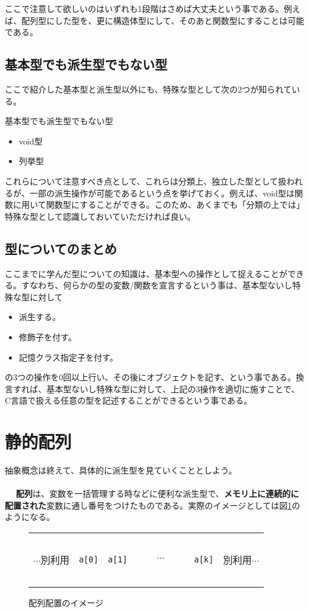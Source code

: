 ここで注意して欲しいのはいずれも1段階はさめば大丈夫という事である。例えば、配列型にした型を、更に構造体型にして、そのあと関数型にすることは可能である。
\subsection{基本型でも派生型でもない型}
ここで紹介した基本型と派生型以外にも、特殊な型として次の2つが知られている。
\begin{itembox}[l]{基本型でも派生型でもない型}
\begin{itemize}
\item void型
\item 列挙型
\end{itemize}
\end{itembox}

これらについて注意すべき点として、これらは分類上、独立した型として扱われるが、一部の派生操作が可能であるという点を挙げておく。例えば、void型は関数に用いて関数型にすることができる。このため、あくまでも「分類の上では」特殊な型として認識しておいていただければ良い。

\subsection{型についてのまとめ}
ここまでに学んだ型についての知識は、基本型への操作として捉えることができる。すなわち、何らかの型の変数/関数を宣言するという事は、基本型ないし特殊な型に対して
\begin{itemize}
\item 派生する。
\item 修飾子を付す。
\item 記憶クラス指定子を付す。
\end{itemize}
の3つの操作を0回以上行い、その後にオブジェクトを記す、という事である。換言すれば、基本型ないし特殊な型に対して、上記の3操作を適切に施すことで、C言語で扱える任意の型を記述することができるという事である。

\section{静的配列}
抽象概念は終えて、具体的に派生型を見ていくこととしよう。
\\ \\　
\textbf{配列}は、変数を一括管理する時などに便利な派生型で、\textbf{メモリ上に連続的に配置された}変数に通し番号をつけたものである。実際のイメージとしては図\ref{chap08_fig01}のようになる。
\begin{figure}[htb]
\centering
\begin{tabular}{|c|c|c|ccc|c|c|}\hline
&　&　&　&　&　&　&\\
$\cdots$別利用&\verb|a[0]|&\verb|a[1]|&&$\cdots$&&\verb|a[k]|&別利用$\cdots$ \\
&　&　&　&　&　&　&\\ \hline
\end{tabular}
\caption{配列配置のイメージ}\label{chap08_fig01}
\end{figure}


